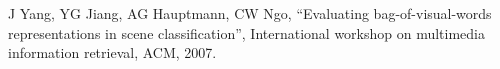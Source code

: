 \documentclass[letterpaper, 10 pt, conference]{ieeeconf}  %
\begin{document}
\begin{thebibliography}{99}

J Yang, YG Jiang, AG Hauptmann, CW Ngo, ``Evaluating bag-of-visual-words representations in scene classification'', International workshop on multimedia information retrieval, ACM, 2007.


\end{thebibliography}
\end{document}

